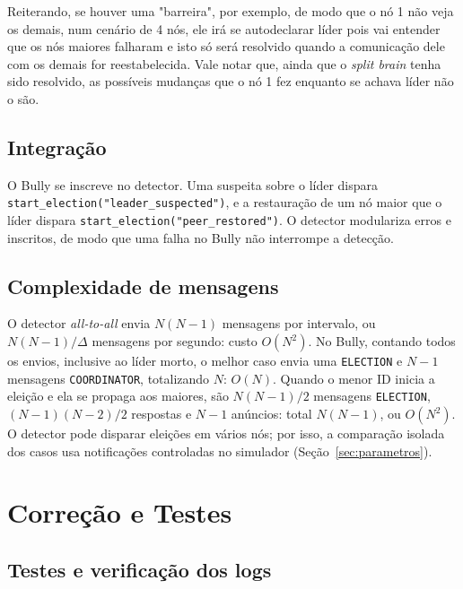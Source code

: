\documentclass[conference]{IEEEtran}
\begin{document}
Reiterando, se houver uma "barreira", por exemplo, de modo que o nó 1 não veja os demais, num cenário de 4 nós, ele irá se autodeclarar líder pois vai entender que os nós maiores falharam e isto só será resolvido quando a comunicação dele  com os demais for reestabelecida. Vale notar que, ainda que o \textit{split brain} tenha sido resolvido, as possíveis mudanças que o nó 1 fez enquanto se achava líder não o são.

\subsection{Integração}
\label{sec:integracao}

O Bully se inscreve no detector. Uma suspeita sobre o líder dispara \texttt{start\_election("leader\_suspected")}, e a restauração de um nó maior que o líder dispara \texttt{start\_election("peer\_restored")}. O detector modulariza erros e inscritos, de modo que uma falha no Bully não interrompe a detecção.

\subsection{Complexidade de mensagens}
\label{sec:complexidade}

O detector \textit{all-to-all} envia $N(N-1)$ mensagens por intervalo, ou $N(N-1)/\Delta$ mensagens por segundo: custo $O(N^2)$. No Bully, contando todos os envios, inclusive ao líder morto, o melhor caso envia uma \texttt{ELECTION} e $N-1$ mensagens \texttt{COORDINATOR}, totalizando $N$: $O(N)$. Quando o menor ID inicia a eleição e ela se propaga aos maiores, são $N(N-1)/2$ mensagens \texttt{ELECTION}, $(N-1)(N-2)/2$ respostas e $N-1$ anúncios: total $N(N-1)$, ou $O(N^2)$. O detector pode disparar eleições em vários nós; por isso, a comparação isolada dos casos usa notificações controladas no simulador (Seção~\ref{sec:parametros}).

\section{Correção e Testes}
\label{sec:correcao}

\subsection{Testes e verificação dos logs}
\label{sec:testes}
\label{sec:verificadores}
\end{document}
